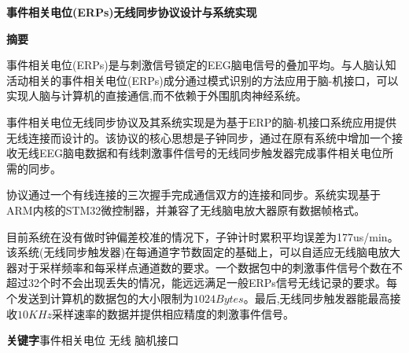 \newpage
\begin{center}
	\heiti{}\textbf{事件相关电位(ERPs)无线同步协议设计与系统实现} 
\end{center} 
\begin{center}
	\heiti{}\textbf{摘\quad 要}
\end{center} 
\vspace{2.5mm}
\songti{}  

事件相关电位(ERPs)是与刺激信号锁定的EEG脑电信号的叠加平均。与人脑认知活动相关的事件相关电位(ERPs)成分通过模式识别的方法应用于脑-机接口，可以实现人脑与计算机的直接通信,而不依赖于外围肌肉神经系统。

事件相关电位无线同步协议及其系统实现是为基于ERP的脑-机接口系统应用提供无线连接而设计的。该协议的核心思想是子钟同步，通过在原有系统中增加一个接收无线EEG脑电数据和有线刺激事件信号的无线同步触发器完成事件相关电位所需的同步。

协议通过一个有线连接的三次握手完成通信双方的连接和同步。系统实现基于ARM内核的STM32微控制器，并兼容了无线脑电放大器原有数据帧格式。

目前系统在没有做时钟偏差校准的情况下，子钟计时累积平均误差为177us/min。该系统(无线同步触发器)在每通道字节数固定的基础上，可以自适应无线脑电放大器对于采样频率和每采样点通道数的要求。一个数据包中的刺激事件信号个数在不超过32个时不会出现丢失的情况，能远远满足一般ERPs信号无线记录的要求。每个发送到计算机的数据包的大小限制为$1024Bytes$。最后,无线同步触发器能最高接收$10KHz$采样速率的数据并提供相应精度的刺激事件信号。

\vspace{3mm}
\heiti\textbf{关键字}\quad \songti 事件相关电位 \quad 无线 \quad 脑机接口


